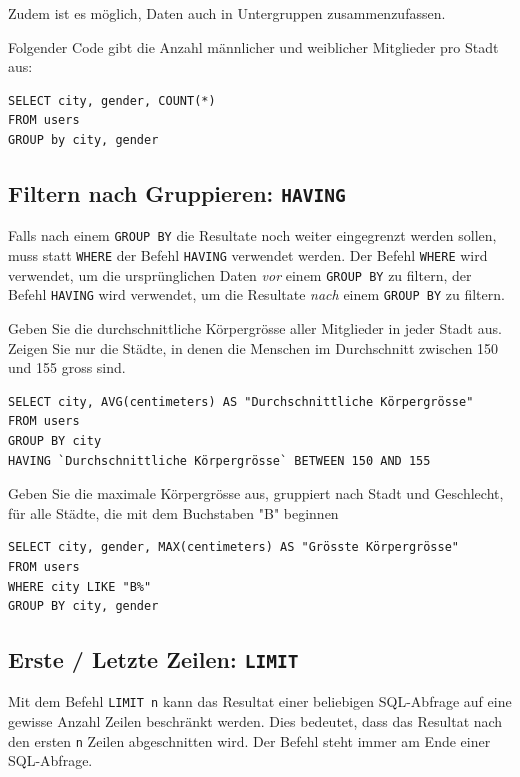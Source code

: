 Zudem ist es möglich, Daten auch in Untergruppen zusammenzufassen.

\begin{myexample}
Folgender Code gibt die Anzahl männlicher und weiblicher Mitglieder pro Stadt aus:
\begin{lstlisting}
SELECT city, gender, COUNT(*) 
FROM users 
GROUP by city, gender
\end{lstlisting}
\end{myexample}

\subsection{Filtern nach Gruppieren: \texorpdfstring{\lstinline|HAVING|}{HAVING}}
Falls nach einem \lstinline|GROUP BY| die Resultate noch weiter eingegrenzt werden sollen, muss statt \lstinline|WHERE| der Befehl \lstinline|HAVING| verwendet werden. Der Befehl \lstinline|WHERE| wird verwendet, um die ursprünglichen Daten \textit{vor} einem \lstinline|GROUP BY| zu filtern, der Befehl \lstinline|HAVING| wird verwendet, um die Resultate \textit{nach} einem \lstinline|GROUP BY| zu filtern.

\begin{mychallenge}
  Geben Sie die durchschnittliche Körpergrösse aller Mitglieder in jeder Stadt aus. Zeigen Sie nur die Städte, in denen die Menschen im Durchschnitt zwischen 150 und 155 gross sind.
  \begin{myanswer}
    \begin{lstlisting}
SELECT city, AVG(centimeters) AS "Durchschnittliche Körpergrösse"
FROM users
GROUP BY city
HAVING `Durchschnittliche Körpergrösse` BETWEEN 150 AND 155
\end{lstlisting}
  \end{myanswer}
\end{mychallenge}

\begin{mychallenge}
  Geben Sie die maximale Körpergrösse aus, gruppiert nach Stadt und Geschlecht, für alle Städte, die mit dem Buchstaben "B" beginnen
  \begin{myanswer}
    \begin{lstlisting}
SELECT city, gender, MAX(centimeters) AS "Grösste Körpergrösse"
FROM users
WHERE city LIKE "B%"
GROUP BY city, gender
\end{lstlisting}
  \end{myanswer}
\end{mychallenge}

\subsection{Erste / Letzte Zeilen: \texorpdfstring{\lstinline|LIMIT|}{LIMIT}}
Mit dem Befehl \lstinline|LIMIT n| kann das Resultat einer beliebigen \gls{SQL}-Abfrage auf eine gewisse Anzahl Zeilen beschränkt werden. Dies bedeutet, dass das Resultat nach den ersten \texttt{n} Zeilen abgeschnitten wird. Der Befehl steht immer am Ende einer SQL-Abfrage.

